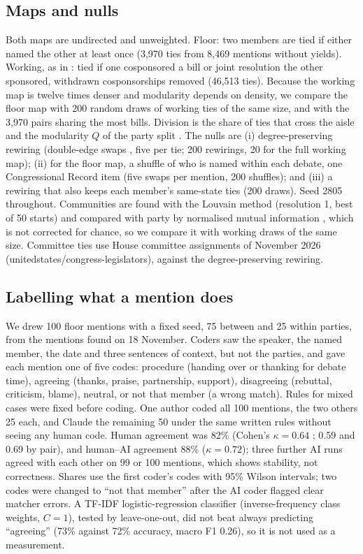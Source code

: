 \documentclass[9pt,twocolumn,twoside]{pnas-new}
\begin{document}
{\subsection*{Maps and nulls}
Both maps are undirected and unweighted. Floor: two members are tied if either named the other at least once (3,970
ties from 8,469 mentions without yields). Working, as in \cite{fowler2006}: tied if one cosponsored a bill or joint
resolution the other sponsored, withdrawn cosponsorships removed (46,513 ties). Because the working map is twelve times
denser and modularity depends on density, we compare the floor map with 200 random draws of working ties of the same
size, and with the 3,970 pairs sharing the most bills. Division is the share of ties that cross the aisle and the
modularity $Q$ of the party split \cite{newman2006}. The nulls are (i) degree-preserving rewiring (double-edge swaps
\cite{maslov2002}, five per tie; 200 rewirings, 20 for the full working map); (ii) for the floor map, a shuffle of who
is named within each debate, one Congressional Record item (five swaps per mention, 200 shuffles); and (iii) a
rewiring that also keeps each member's same-state ties (200 draws). Seed 2805 throughout. Communities are found with
the Louvain method \cite{blondel2008} (resolution 1, best of 50 starts) and compared with party by normalised mutual
information \cite{danon2005}, which is not corrected for chance, so we compare it with working draws of the same size.
Committee ties use House committee assignments of November 2026 (unitedstates/congress-legislators), against the
degree-preserving rewiring.

\subsection*{Labelling what a mention does}
We drew 100 floor mentions with a fixed seed, 75 between and 25 within parties, from the mentions found on 18 November.
Coders saw the speaker, the named member, the date and three sentences of context, but not the parties, and gave each
mention one of five codes: procedure (handing over or thanking for debate time), agreeing (thanks, praise,
partnership, support), disagreeing (rebuttal, criticism, blame), neutral, or not that member (a wrong match). Rules
for mixed cases were fixed before coding. One author coded all 100 mentions, the two others 25 each, and Claude the
remaining 50 under the same written rules without seeing any human code. Human agreement was 82\% (Cohen's $\kappa =
0.64$ \cite{cohen1960}; 0.59 and 0.69 by pair), and human--AI agreement 88\% ($\kappa = 0.72$); three further AI runs
agreed with each other on 99 or 100 mentions, which shows stability, not correctness. Shares use the first coder's
codes with 95\% Wilson intervals; two codes were changed to ``not that member'' after the AI coder flagged clear
matcher errors. A TF-IDF logistic-regression classifier (inverse-frequency class weights, $C = 1$), tested by
leave-one-out, did not beat always predicting ``agreeing'' (73\% against 72\% accuracy, macro F1 0.26), so it is not
used as a measurement.

}
\end{document}
